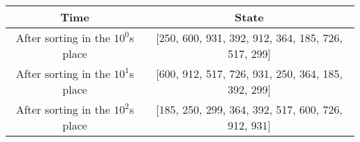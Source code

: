 \begin{center}
\begin{tabular}{| c | c |}
\hline
\textbf{Time} & \textbf{State} \\
\hline
After sorting in the $10^0$s place & [250, 600, 931, 392, 912, 364, 185, 726, 517, 299]\\ 
 \hline 
After sorting in the $10^1$s place & [600, 912, 517, 726, 931, 250, 364, 185, 392, 299]\\ 
 \hline 
After sorting in the $10^2$s place & [185, 250, 299, 364, 392, 517, 600, 726, 912, 931]\\ 
 \hline 
\end{tabular}
\end{center}
